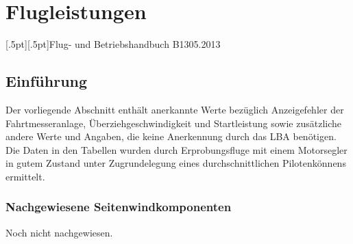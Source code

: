 
\chapter{Flugleistungen}

[.5pt][.5pt]{\pagemark}{}{\headmark}{Flug- und Betriebshandbuch B13}{}{05.2013}
\pagestyle{Flughandbuch}
\renewcommand*\chapterpagestyle{Flughandbuch}


\section{Einführung}
Der vorliegende Abschnitt enthält anerkannte Werte bezüglich Anzeigefehler der
Fahrtmesseranlage, Überziehgeschwindigkeit und Startleistung sowie zusätzliche
andere Werte und Angaben, die keine Anerkennung durch das LBA benötigen.
Die Daten in den Tabellen wurden durch Erprobungsfluge mit einem Motorsegler
in gutem Zustand unter Zugrundelegung eines durchschnittlichen Pilotenkönnens
ermittelt.

\newpage


\subsection{Nachgewiesene Seitenwindkomponenten}
Noch nicht nachgewiesen.
%
